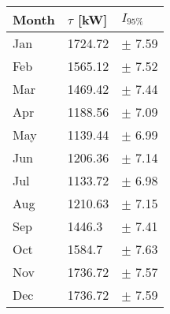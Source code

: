 \begin{tabular}{lll}
\toprule
Month & $\tau$ [kW] &   $I_{95\%}$ \\
\midrule
  Jan &     1724.72 &   $\pm$ 7.59 \\
  Feb &     1565.12 &   $\pm$ 7.52 \\
  Mar &     1469.42 &   $\pm$ 7.44 \\
  Apr &     1188.56 &   $\pm$ 7.09 \\
  May &     1139.44 &   $\pm$ 6.99 \\
  Jun &     1206.36 &   $\pm$ 7.14 \\
  Jul &     1133.72 &   $\pm$ 6.98 \\
  Aug &     1210.63 &   $\pm$ 7.15 \\
  Sep &      1446.3 &   $\pm$ 7.41 \\
  Oct &      1584.7 &   $\pm$ 7.63 \\
  Nov &     1736.72 &   $\pm$ 7.57 \\
  Dec &     1736.72 &   $\pm$ 7.59 \\
\bottomrule
\end{tabular}
